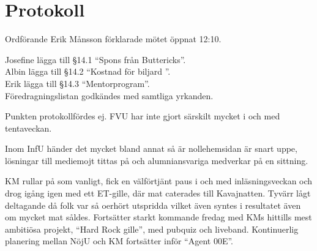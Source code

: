 \documentclass[10pt]{article}
\def\mo{Erik Månsson}
\begin{document}
\section*{Protokoll}
\begin{paragrafer}
Ordförande {\mo} förklarade mötet öppnat 12:10.

{\valavmo}

{\valavms}

{\valavj}

{\tosg}

{\ingaadj}


Josefine \ypa lägga till \S14.1 ``Spons från Buttericks''.\\
Albin \ypa lägga till \S14.2 ``Kostnad för biljard ''.\\
Erik \ypa lägga till \S14.3 ``Mentorprogram''.\\
Föredragningslistan godkändes med samtliga yrkanden.

\begin{fyllnadsval} %
\end{fyllnadsval}

\begin{paragrafer}
Punkten protokollfördes ej.
FVU har inte gjort särskilt mycket i och med tentaveckan.

Inom InfU händer det mycket bland annat så är nollehemsidan är snart uppe, lösningar till mediemojt tittas på och alumniansvariga medverkar på en sittning.

KM rullar på som vanligt, fick en välförtjänt paus i och med inläsningsveckan och drog igång igen med ett ET-gille, där mat caterades till Kavajnatten. Tyvärr lågt deltagande då folk var så oerhört utspridda vilket även syntes i resultatet även om mycket mat såldes. Fortsätter starkt kommande fredag med KMs hittills mest ambitiösa projekt, ``Hard Rock gille'', med pubquiz och liveband. Kontinuerlig planering mellan NöjU och KM fortsätter inför ``Agent 00E''.


\end{paragrafer}
\end{paragrafer}
\end{document}
